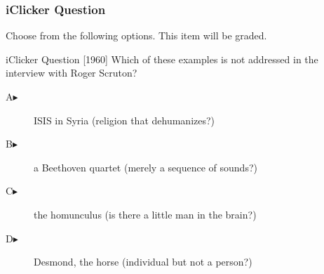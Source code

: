 \begin{frame}
  \frametitle{iClicker Question}
Choose from the following options. This item will be graded.
\begin{block}{iClicker Question}
[1960] Which of these examples is not addressed in the interview with Roger Scruton?
\end{block}
\begin{description}
\item[A\hspace{.2in}$\blacktriangleright$] ISIS in Syria (religion that dehumanizes?)
\item[B\hspace{.2in}$\blacktriangleright$] a Beethoven quartet (merely a sequence of sounds?)
\item[C\hspace{.2in}$\blacktriangleright$] the homunculus (is there a little man in the brain?)
\item[D\hspace{.2in}$\blacktriangleright$] Desmond, the horse (individual but not a person?)
\end{description}
\end{frame}
